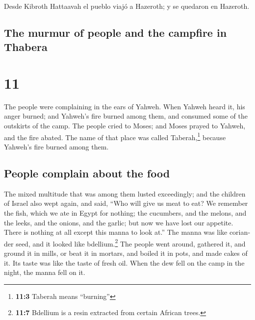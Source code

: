 \begin{paracol}{2}
 Desde Kibroth Hattaavah el pueblo viajó a Hazeroth; y se
quedaron en Hazeroth.

\switchcolumn
\begin{otherlanguage}{english}

\hypertarget{the-murmur-of-people-and-the-campfire-in-thabera}{%
\subsection{The murmur of people and the campfire in
Thabera}\label{the-murmur-of-people-and-the-campfire-in-thabera}}

\hypertarget{section-21}{%
\section{11}\label{section-21}}

 The people were complaining in the ears of Yahweh. When
Yahweh heard it, his anger burned; and Yahweh's fire burned among them,
and consumed some of the outskirts of the camp.  The
people cried to Moses; and Moses prayed to Yahweh, and the fire abated.
 The name of that place was called Taberah,\footnote{\textbf{11:3}
  Taberah means ``burning''} because Yahweh's fire burned among them.

\hypertarget{people-complain-about-the-food}{%
\subsection{People complain about the
food}\label{people-complain-about-the-food}}

 The mixed multitude that was among them lusted
exceedingly; and the children of Israel also wept again, and said, ``Who
will give us meat to eat?  We remember the fish, which we
ate in Egypt for nothing; the cucumbers, and the melons, and the leeks,
and the onions, and the garlic;  but now we have lost our
appetite. There is nothing at all except this manna to look at.''
 The manna was like coriander seed, and it looked like
bdellium.\footnote{\textbf{11:7} Bdellium is a resin extracted from
  certain African trees.}  The people went around,
gathered it, and ground it in mills, or beat it in mortars, and boiled
it in pots, and made cakes of it. Its taste was like the taste of fresh
oil.  When the dew fell on the camp in the night, the
manna fell on it.


\end{otherlanguage}
\end{paracol}
